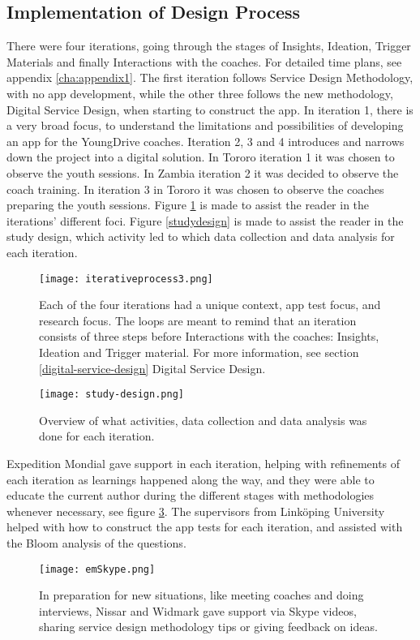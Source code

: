 \subsection{Implementation of Design Process}
There were four iterations, going through the stages of Insights, Ideation, Trigger Materials and finally Interactions with the coaches. For detailed time plans, see appendix \ref{cha:appendix1}. The first iteration follows Service Design Methodology, with no app development, while the other three follows the new methodology, Digital Service Design, when starting to construct the app. In iteration 1, there is a very broad focus, to understand the limitations and possibilities of developing an app for the YoungDrive coaches. Iteration 2, 3 and 4 introduces and narrows down the project into a digital solution. In Tororo iteration 1 it was chosen to observe the youth sessions. In Zambia iteration 2 it was decided to observe the coach training. In iteration 3 in Tororo it was chosen to observe the coaches preparing the youth sessions. Figure \ref{fig:methods} is made to assist the reader in the iterations' different foci. Figure \ref{studydesign} is made to assist the reader in the study design, which activity led to which data collection and data analysis for each iteration.

\begin{figure}[h]
    \centering
    \texttt{[image: iterativeprocess3.png]}
    \caption{Each of the four iterations had a unique context, app test focus, and research focus. The loops are meant to remind that an iteration consists of three steps before Interactions with the coaches: Insights, Ideation and Trigger material. For more information, see section \ref{digital-service-design} Digital Service Design.}
    \label{fig:methods}
\end{figure}

\begin{figure}[h]
    \centering
    \texttt{[image: study-design.png]}
    \caption{Overview of what activities, data collection and data analysis was done for each iteration.}
    \label{fig:studydesign}
\end{figure}

Expedition Mondial gave support in each iteration, helping with refinements of each iteration as learnings happened along the way, and they were able to educate the current author during the different stages with methodologies whenever necessary, see figure \ref{fig:emSkype}. The supervisors  from Linköping University helped with how to construct the app tests for each iteration, and assisted with the Bloom analysis of the questions.

\begin{figure}[h]
    \centering
    \texttt{[image: emSkype.png]}
    \caption{In preparation for new situations, like meeting coaches and doing interviews, Nissar and Widmark gave support via Skype videos, sharing service design methodology tips or giving feedback on ideas.}
    \label{fig:emSkype}
\end{figure}
